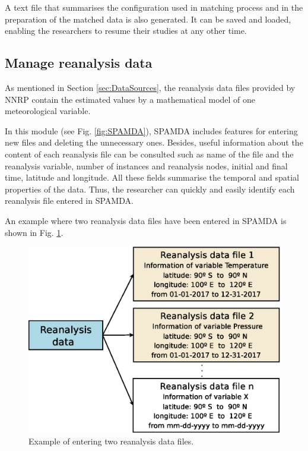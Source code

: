 \documentclass[energies,article,submit,moreauthors,pdftex]{Definitions/mdpi}
\begin{document}
				A text file that summarises the configuration used in matching process and in the preparation of the matched data is also generated. It can be saved and loaded, enabling the researchers to resume their studies at any other time.
				
				
			\subsection{Manage reanalysis data}
				
				As mentioned in Section \ref{sec:DataSources}, the reanalysis data files provided by NNRP contain the estimated values by a mathematical model of one meteorological variable.
				
				In this module (see Fig. \ref{fig:SPAMDA}), SPAMDA includes features for entering new files and deleting the unnecessary ones. Besides, useful information about the content of each reanalysis file can be consulted such as name of the file and the reanalysis variable, number of instances and reanalysis nodes, initial and final time, latitude and longitude. All these fields summarise the temporal and spatial properties of the data. Thus, the researcher can quickly and easily identify each reanalysis file entered in SPAMDA.
				
				An example where two reanalysis data files have been entered in SPAMDA is shown in Fig. \ref{fig:manageReanalisys}.
				
				\begin{figure}[ht!]
					\centering
					\includegraphics[scale=0.45]{figures/FigureManageReanalisys.eps}
					\caption{Example of entering two reanalysis data files.}
					\label{fig:manageReanalisys}
				\end{figure}
				
\end{document}
